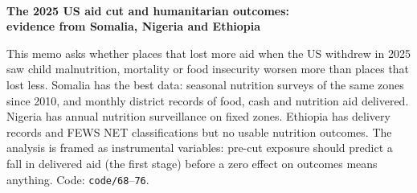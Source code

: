 \documentclass[11pt]{article}
\begin{document}
{\\[3pt]{\Large\bfseries The 2025 US aid cut and humanitarian outcomes:\\ evidence from Somalia, Nigeria and Ethiopia}}

\medskip
This memo asks whether places that lost more aid when the US withdrew in 2025 saw child malnutrition, mortality or food insecurity worsen more than places that lost less. Somalia has the best data: seasonal nutrition surveys of the same zones since 2010, and monthly district records of food, cash and nutrition aid delivered. Nigeria has annual nutrition surveillance on fixed zones. Ethiopia has delivery records and FEWS NET classifications but no usable nutrition outcomes. The analysis is framed as instrumental variables: pre-cut exposure should predict a fall in delivered aid (the first stage) before a zero effect on outcomes means anything. Code: \texttt{code/68}--\texttt{76}.
\end{document}
